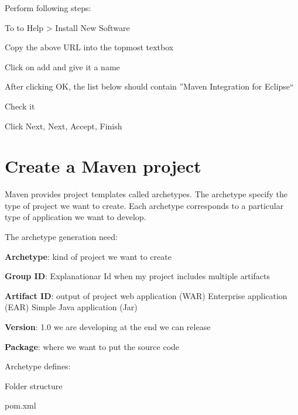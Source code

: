 \documentclass{article}
\begin{document}
Perform following steps:
\begin{compactitem}
\item To to Help > Install New Software
\item Copy the above URL into the topmost textbox
\item Click on add and give it a name
\item After clicking OK, the list below should contain ''Maven Integration for Eclipse``
\item Check it
\item Click Next, Next, Accept, Finish
\end{compactitem}

\section{Create a Maven project}
Maven provides project templates called archetypes. The archetype
specify the type of project we want to create. Each archetype
corresponds to a particular type of application we want to develop.

The archetype generation need:
\begin{compactitem}
\item \textbf{Archetype}: kind of project we want to create
\item \textbf{Group ID}: Explanationar Id when my project includes multiple artifacts
\item \textbf{Artifact ID}: output of project web application (WAR) Enterprise application (EAR) Simple Java application (Jar)
\item \textbf{Version}: 1.0 we are developing at the end we can release
\item \textbf{Package}: where we want to put the source code
\end{compactitem}

Archetype defines:
\begin{compactitem}
\item Folder structure
\item pom.xml
\end{compactitem}
\end{document}
